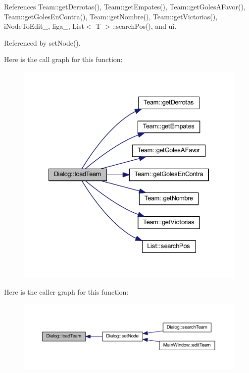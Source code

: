 References Team\+::get\+Derrotas(), Team\+::get\+Empates(), Team\+::get\+Goles\+A\+Favor(), Team\+::get\+Goles\+En\+Contra(), Team\+::get\+Nombre(), Team\+::get\+Victorias(), i\+Node\+To\+Edit\+\_\+, liga\+\_\+, List$<$ T $>$\+::search\+Pos(), and ui.



Referenced by set\+Node().



Here is the call graph for this function\+:
\nopagebreak
\begin{figure}[H]
\begin{center}
\leavevmode
\includegraphics[width=334pt]{df/da9/class_dialog_a6f6564b3dab010fadb064d1bb46ac37c_cgraph}
\end{center}
\end{figure}




Here is the caller graph for this function\+:
\nopagebreak
\begin{figure}[H]
\begin{center}
\leavevmode
\includegraphics[width=350pt]{df/da9/class_dialog_a6f6564b3dab010fadb064d1bb46ac37c_icgraph}
\end{center}
\end{figure}


